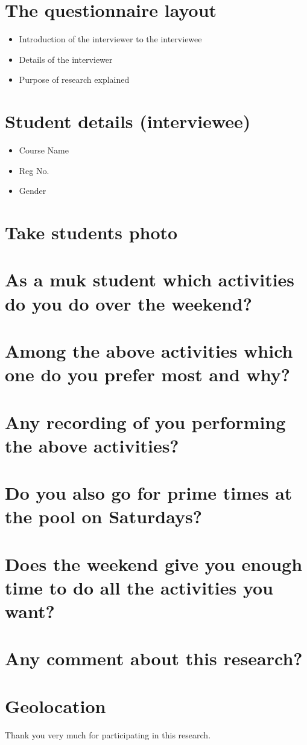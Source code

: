 \documentclass[12pt,a4paper]{article}
\begin{document}
\section{The questionnaire layout}
\begin{itemize}
\item Introduction of the interviewer to the interviewee
\item Details of the interviewer
\item Purpose of research explained
\end{itemize}
\section{Student details (interviewee)}
\begin{itemize}
\item Course Name
\item Reg No.
\item Gender
\end{itemize}
\section{ Take students photo}
\section{As a muk student which activities do you do over the weekend?}
\section{Among the above activities which one do you prefer most and why?}
\section{Any recording of you performing the above activities?}
\section{Do you also go for prime times at the pool on Saturdays?}
\section{Does the weekend give you enough time to do all the activities you want?}
\section{Any comment about this research?}
\section{Geolocation}
Thank you very much for participating in this research.
\end{document}
